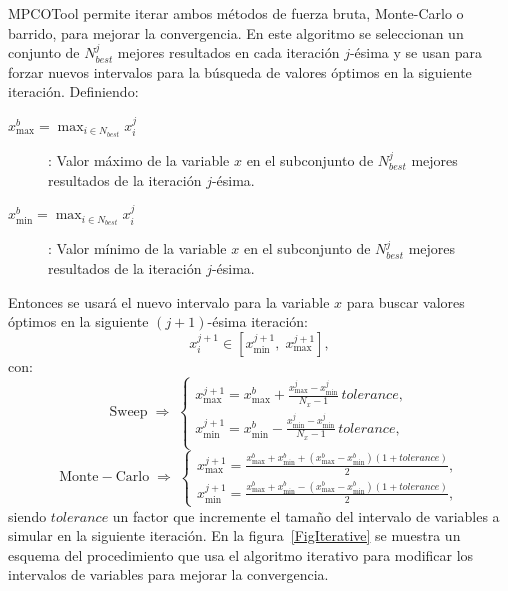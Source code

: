 \documentclass[a4paper]{report}
\newcommand{\EQ}[2]
{\begin{equation}#1\label{#2}\end{equation}}
\begin{document}
MPCOTool permite iterar ambos métodos de fuerza bruta, Monte-Carlo o barrido,
para mejorar la convergencia. En este algoritmo se seleccionan un conjunto de
$N_{best}^j$ mejores resultados en cada iteración $j$-ésima y se usan para
forzar nuevos intervalos para la búsqueda de valores óptimos en la siguiente
iteración. Definiendo:
\begin{description}
\item[$\displaystyle x_{\max}^b=\max_{i\in N_{best}}x_i^j$]: Valor máximo de la
	variable $x$ en el subconjunto de $N_{best}^j$ mejores resultados de la
	iteración $j$-ésima.
\item[$\displaystyle x_{\min}^b=\max_{i\in N_{best}}x_i^j$]: Valor mínimo de la
	variable $x$ en el subconjunto de $N_{best}^j$ mejores resultados de la
	iteración $j$-ésima.
\end{description}
Entonces se usará el nuevo intervalo para la variable $x$ para buscar valores
óptimos en la siguiente $(j+1)$-ésima iteración:
\EQ{x_i^{j+1}\in\left[x_{\min}^{j+1},\;x_{\max}^{j+1}\right],}
{EqIterationInterval}
con:
\[
	\mathrm{Sweep}\;\Rightarrow\;\left\{\begin{array}{c}
	\displaystyle
	x_{\max}^{j+1}=x_{\max}^b+\frac{x_{\max}^j-x_{\min}^j}{N_x-1}\,tolerance,\\
	\displaystyle
	x_{\min}^{j+1}=x_{\min}^b-\frac{x_{\min}^j-x_{\min}^j}{N_x-1}\,tolerance,\\
	\end{array}\right.
\]
\EQ
{
	\mathrm{Monte-Carlo}\;\Rightarrow\;\left\{\begin{array}{c}
	\displaystyle x_{\max}^{j+1}=\frac{x_{\max}^b+x_{\min}^b
	+\left(x_{\max}^b-x_{\min}^b\right)(1+tolerance)}{2},\\
	\displaystyle x_{\min}^{j+1}=\frac{x_{\max}^b+x_{\min}^b
	-\left(x_{\max}^b-x_{\min}^b\right)(1+tolerance)}{2},
	\end{array}\right.
}{EqIterationIntervalII}
siendo $tolerance$ un factor que incremente el tamaño del intervalo de variables
a simular en la siguiente iteración.
En la figura~\ref{FigIterative} se muestra un esquema del procedimiento que usa
el algoritmo iterativo para modificar los intervalos de variables para mejorar
la convergencia.
\end{document}
